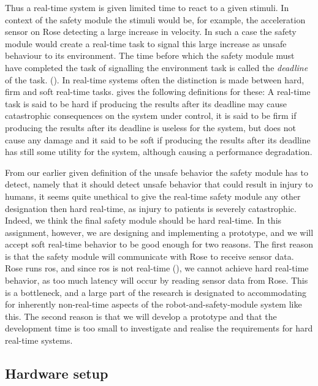 \documentclass[12pt]{scrreprt}
\begin{document}
Thus a real-time system is given limited time to react to a given stimuli. In context of the safety module the stimuli would be, for example, the acceleration sensor on Rose detecting a large increase in velocity. In such a case the safety module would create a real-time task to signal this large increase as unsafe behaviour to its environment. The time before which the safety module must have completed the task of signalling the environment task is called the \textit{deadline} of the task. (\cite{realtime_systems}). In real-time systems often the distinction is made between hard, firm and soft real-time tasks. \cite{buttazo} gives the following definitions for these: A real-time task is said to be hard if producing the results after its deadline
may cause catastrophic consequences on the system under control, it is said to be firm if producing the results after its deadline is useless for the system, but does not cause any damage and it said to be soft if producing the results after its deadline has still some utility for the system, although causing a performance degradation.
\par
From our earlier given definition of the unsafe behavior the safety module has to detect, namely that it should detect unsafe behavior that could result in injury to humans, it seems quite unethical to give the real-time safety module any other designation then hard real-time, as injury to patients is severely catastrophic. Indeed, we think the final safety module should be hard real-time. In this assignment, however, we are designing and implementing a prototype, and we will accept soft real-time behavior to be good enough for two reasons. The first reason is that the safety module will communicate with Rose to receive sensor data. Rose runs \acrfull{ros}, and since \acrlong{ros} is not real-time (\cite{why_is_ros_not_realtime}), we cannot achieve hard real-time behavior, as too much latency will occur by reading sensor data from Rose. This is a bottleneck, and a large part of the research is designated to accommodating for inherently non-real-time aspects of the robot-and-safety-module system like this. The second reason is that we will develop a prototype and that the development time is too small to investigate and realise the requirements for hard real-time systems.



\subsection{Hardware setup}
\label{Hardware setup}
\end{document}
